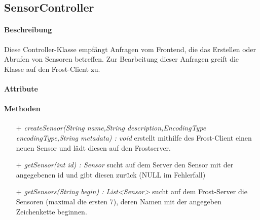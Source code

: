 \subsection{SensorController}

\paragraph{Beschreibung}
Diese Controller-Klasse empfängt Anfragen vom Frontend, die das Erstellen oder Abrufen von Sensoren betreffen. Zur Bearbeitung dieser Anfragen greift die Klasse auf den Frost-Client zu.


\paragraph{Attribute}

\paragraph{Methoden}
\begin{itemize}
\item[+] \textit{ createSensor(String name,String description,EncodingType encodingType,String metadata) : void }
erstellt mithilfe des Frost-Client einen neuen Sensor und lädt diesen auf den Frostserver.
\item[+] \textit{getSensor(int id) : Sensor}
sucht auf dem Server den Sensor mit der angegebenen id und gibt diesen zurück (NULL im Fehlerfall)
\item[+] \textit{getSensors(String begin) : List<Sensor> }
sucht auf dem Frost-Server die Sensoren (maximal die ersten 7), deren Namen mit der angegeben Zeichenkette beginnen.
\end{itemize}